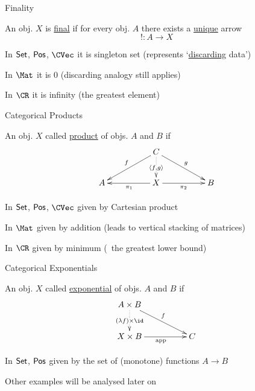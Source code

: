 \documentclass{beamer}
\def\pv#1#2{\langle #1, #2 \rangle}
\begin{document}
\begin{frame}{Finality}
        \begin{definition}
           An obj. $X$ is \alert{\underline{final}} if for every obj. $A$ there exists a
           \alert{\underline{unique}} arrow
           \[
                   ! : A \to X
           \]
        \end{definition}
        
        \pause
        \medskip
        In $\mathsf{Set}$, $\mathsf{Pos}$, $\CVec$ it is singleton set
        (represents `\alert{\underline{discarding}} data')
        
        \medskip
        In $\Mat$ it is $0$ (discarding analogy still applies)

        \medskip
        In $\CR$ it is infinity (the greatest element)
\end{frame}


\begin{frame}{Categorical Products}
        \begin{definition}
        An obj. $X$ called \alert{\underline{product}} of objs. $A$ and $B$ if
        \[
               \xymatrix@C=50pt{
                       & C \ar[dl]_{f} \ar[dr]^{g} \ar@{.>}[d]|{ \pv{f}{g} } & 
                       \\
                       A & \ar[l]^{\pi_1} \ar[r]_{\pi_2}
                       X & B
               }
        \]
        \end{definition}

        \pause
        \medskip
        In $\mathsf{Set}$, $\mathsf{Pos}$, $\CVec$ given by Cartesian product

        \medskip
        In $\Mat$ given by addition (leads to vertical stacking of matrices)

        \medskip
        In $\CR$ given by minimum  (\ie\ the greatest lower bound)
\end{frame}


\begin{frame}{Categorical Exponentials}

        \begin{definition}
                An obj. $X$ called \alert{\underline{exponential}} of objs. $A$
                and $B$ if 
        \[
               \xymatrix@C=50pt{
                       A \times B \ar[dr]^{f} 
                       \ar@{.>}[d]|{(\lambda f) \times \id}
                       \\
                       X \times B \ar[r]_{\mathrm{app}} & C
               }
        \]
        \end{definition}

        \pause
        \medskip
        In $\mathsf{Set}$, $\mathsf{Pos}$ given by the set of (monotone) functions $A \to B$

        \pause
        \medskip
        Other examples will be analysed later on
\end{frame}
\end{document}
